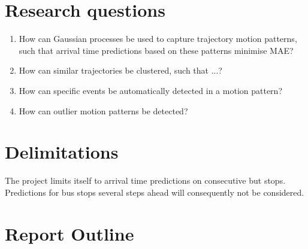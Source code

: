 \section{Research questions}
\label{sec:research-questions}

\begin{enumerate}
\item How can Gaussian processes be used to capture trajectory motion
  patterns, such that arrival time predictions based on these patterns minimise MAE?

\item How can similar trajectories be clustered, such that ...?
  
\item How can specific events be automatically detected in a
  motion pattern?

\item How can outlier motion patterns be detected?
\end{enumerate}



\section{Delimitations}
\label{sec:delimitations}
The project limits itself to arrival time predictions on consecutive
but stops. Predictions for bus stops several steps ahead will
consequently not be considered.



\section{Report Outline}

